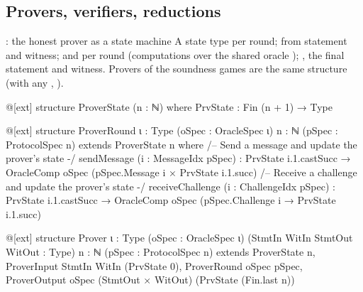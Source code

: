
\subsection{Provers, verifiers, reductions}\label{sec:gen-lib-ark-reductions}

\begin{define}{: the honest prover as a state machine}
A state type per round;  from statement and witness;  and
 per round (computations over the shared oracle );
, the final statement and witness. Provers of the soundness games are the same
structure (with any , ).
\end{define}

\begin{leancode}
@[ext]
structure ProverState (n : ℕ) where
  PrvState : Fin (n + 1) → Type
\end{leancode}



\begin{leancode}
@[ext]
structure ProverRound {ι : Type} (oSpec : OracleSpec ι) {n : ℕ} (pSpec : ProtocolSpec n)
    extends ProverState n where
  /-- Send a message and update the prover's state -/
  sendMessage (i : MessageIdx pSpec) :
    PrvState i.1.castSucc → OracleComp oSpec (pSpec.Message i × PrvState i.1.succ)
  /-- Receive a challenge and update the prover's state -/
  receiveChallenge (i : ChallengeIdx pSpec) :
    PrvState i.1.castSucc → OracleComp oSpec (pSpec.Challenge i → PrvState i.1.succ)
\end{leancode}



\begin{leancode}
@[ext]
structure Prover {ι : Type} (oSpec : OracleSpec ι)
    (StmtIn WitIn StmtOut WitOut : Type)
    {n : ℕ} (pSpec : ProtocolSpec n) extends
      ProverState n,
      ProverInput StmtIn WitIn (PrvState 0),
      ProverRound oSpec pSpec,
      ProverOutput oSpec (StmtOut × WitOut) (PrvState (Fin.last n))
\end{leancode}


